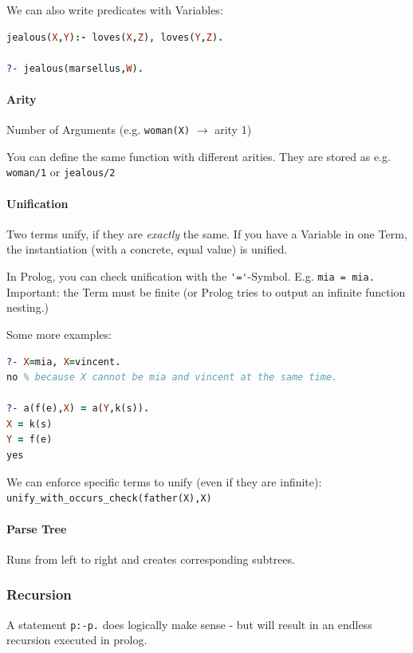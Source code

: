 We can also write predicates with Variables: 
\begin{lstlisting}[language=Prolog]
jealous(X,Y):- loves(X,Z), loves(Y,Z).

?- jealous(marsellus,W).
\end{lstlisting}

\paragraph{Arity}

Number of Arguments (e.g. \lstinline|woman(X)| $\rightarrow$ arity 1)

You can define the same function with different arities. They are stored as e.g. \lstinline|woman/1| or \lstinline|jealous/2|

\paragraph{Unification}

Two terms unify, if they are \emph{exactly} the same. If you have a Variable in one Term, the instantiation (with a concrete, equal value) is unified.

In Prolog, you can check unification with the \lstinline|'='|-Symbol. E.g. \lstinline|mia = mia.| Important: the Term must be finite (or Prolog tries to output an infinite function nesting.)

Some more examples:
\begin{lstlisting}[language=Prolog]
?- X=mia, X=vincent.
no % because X cannot be mia and vincent at the same time.

?- a(f(e),X) = a(Y,k(s)).
X = k(s)
Y = f(e)
yes
\end{lstlisting}

We can enforce specific terms to unify (even if they are infinite):
\lstinline|unify_with_occurs_check(father(X),X)|

\paragraph{Parse Tree}

Runs from left to right and creates corresponding subtrees.


\subsubsection{Recursion}

A statement \lstinline|p:-p.| does logically make sense - but will result in an endless recursion executed in prolog.

